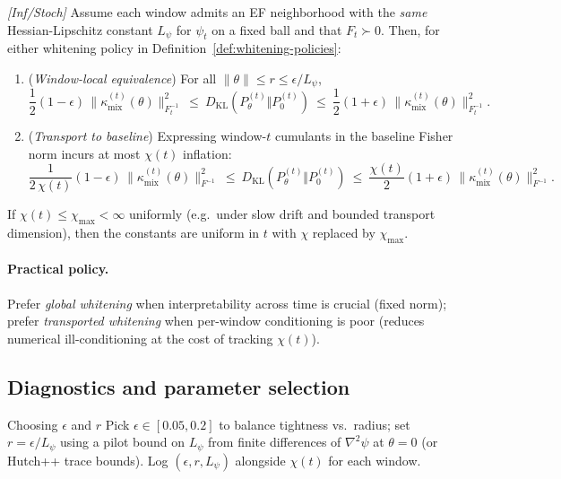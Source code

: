 \begin{proposition}\label{prop:window-transport}
\emph{[\textup{Inf/Stoch}]} Assume each window admits an EF neighborhood with the \emph{same} Hessian-Lipschitz constant $L_\psi$ for $\psi_t$ on a fixed ball and that $F_t\succ 0$. Then, for either whitening policy in Definition~\ref{def:whitening-policies}:
\begin{enumerate}[leftmargin=*]
\item (\emph{Window-local equivalence}) For all $\|\theta\|\le r\le \epsilon/L_\psi$,
\[
\frac12(1-\epsilon)\,\|\kappa_{\mathrm{mix}}^{(t)}(\theta)\|_{F_t^{-1}}^{2}
\ \le\ D_{\mathrm{KL}}(P_{\theta}^{(t)}\Vert P_{0}^{(t)})\
\le\ \frac12(1+\epsilon)\,\|\kappa_{\mathrm{mix}}^{(t)}(\theta)\|_{F_t^{-1}}^{2}.
\]
\item (\emph{Transport to baseline}) Expressing window-$t$ cumulants in the baseline Fisher norm incurs at most $\chi(t)$ inflation:
\[
\frac1{2\,\chi(t)}(1-\epsilon)\,\|\kappa_{\mathrm{mix}}^{(t)}(\theta)\|_{F^{-1}}^{2}
\ \le\ D_{\mathrm{KL}}(P_{\theta}^{(t)}\Vert P_{0}^{(t)})\
\le\ \frac{\chi(t)}{2}(1+\epsilon)\,\|\kappa_{\mathrm{mix}}^{(t)}(\theta)\|_{F^{-1}}^{2}.
\]
\end{enumerate}
If $\chi(t)\le \chi_{\max}<\infty$ uniformly (e.g.\ under slow drift and bounded transport dimension), then the constants are uniform in $t$ with $\chi$ replaced by $\chi_{\max}$.
\end{proposition}

\paragraph{Practical policy.}
Prefer \emph{global whitening} when interpretability across time is crucial (fixed norm); prefer \emph{transported whitening} when per-window conditioning is poor (reduces numerical ill-conditioning at the cost of tracking $\chi(t)$).

\subsection{Diagnostics and parameter selection}

\begin{rulex}{Choosing \(\epsilon\) and \(r\)}
Pick $\epsilon\in[0.05,0.2]$ to balance tightness vs.\ radius; set $r=\epsilon/L_\psi$ using a pilot bound on $L_\psi$ from finite differences of $\nabla^2\psi$ at $\theta=0$ (or Hutch++ trace bounds). Log $(\epsilon,r,L_\psi)$ alongside $\chi(t)$ for each window.
\end{rulex}


